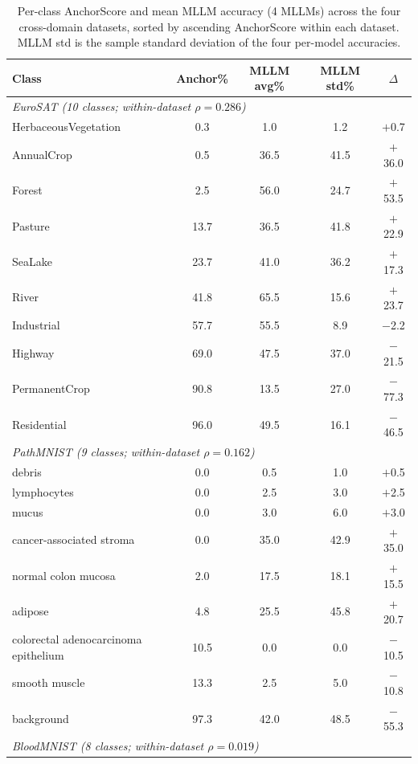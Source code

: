 \documentclass[a4paper,fleqn]{cas-sc}
\begin{document}
\begin{table}[t]
\caption{Per-class AnchorScore and mean MLLM accuracy (4 MLLMs) across the four cross-domain datasets, sorted by ascending AnchorScore within each dataset. MLLM std is the sample standard deviation of the four per-model accuracies.}
\label{tab:cross_domain_per_class}
\centering
\footnotesize
\setlength{\tabcolsep}{2.8pt}
\begin{tabular}{lcccc}
\toprule
\textbf{Class} & \textbf{Anchor\%} & \textbf{MLLM avg\%} & \textbf{MLLM std\%} & $\Delta$ \\
\midrule
\multicolumn{5}{l}{\textit{EuroSAT (10 classes; within-dataset $\rho=0.286$)}} \\
HerbaceousVegetation & 0.3 & 1.0 & 1.2 & $+$0.7 \\
AnnualCrop & 0.5 & 36.5 & 41.5 & $+$36.0 \\
Forest & 2.5 & 56.0 & 24.7 & $+$53.5 \\
Pasture & 13.7 & 36.5 & 41.8 & $+$22.9 \\
SeaLake & 23.7 & 41.0 & 36.2 & $+$17.3 \\
River & 41.8 & 65.5 & 15.6 & $+$23.7 \\
Industrial & 57.7 & 55.5 & 8.9 & $-$2.2 \\
Highway & 69.0 & 47.5 & 37.0 & $-$21.5 \\
PermanentCrop & 90.8 & 13.5 & 27.0 & $-$77.3 \\
Residential & 96.0 & 49.5 & 16.1 & $-$46.5 \\
\midrule
\multicolumn{5}{l}{\textit{PathMNIST (9 classes; within-dataset $\rho=0.162$)}} \\
debris & 0.0 & 0.5 & 1.0 & $+$0.5 \\
lymphocytes & 0.0 & 2.5 & 3.0 & $+$2.5 \\
mucus & 0.0 & 3.0 & 6.0 & $+$3.0 \\
cancer-associated stroma & 0.0 & 35.0 & 42.9 & $+$35.0 \\
normal colon mucosa & 2.0 & 17.5 & 18.1 & $+$15.5 \\
adipose & 4.8 & 25.5 & 45.8 & $+$20.7 \\
colorectal adenocarcinoma epithelium & 10.5 & 0.0 & 0.0 & $-$10.5 \\
smooth muscle & 13.3 & 2.5 & 5.0 & $-$10.8 \\
background & 97.3 & 42.0 & 48.5 & $-$55.3 \\
\midrule
\multicolumn{5}{l}{\textit{BloodMNIST (8 classes; within-dataset $\rho=0.019$)}} \\

\end{tabular}
\end{table}
\end{document}
